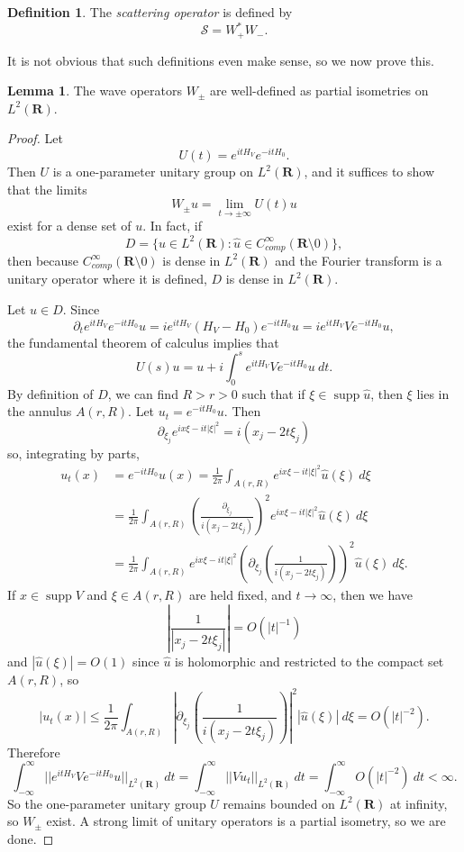 \documentclass[12pt]{report}
\newcommand{\RR}{\mathbf{R}}
\DeclareMathOperator{\supp}{supp}
\newcommand{\dfn}[1]{\emph{#1}\index{#1}}
\theoremstyle{definition}
\newtheorem{lemma}[theorem]{Lemma}
\newtheorem{definition}[theorem]{Definition}
\begin{document}
\begin{definition}
The \dfn{scattering operator} is defined by
$$\mathcal S = W_+^*W_-.$$
\end{definition}
It is not obvious that such definitions even make sense, so we now prove this.
\begin{lemma}
The wave operators $W_\pm$ are well-defined as partial isometries on $L^2(\RR)$.
\end{lemma}
\begin{proof}
Let
$$U(t) = e^{itH_V}e^{-itH_0}.$$
Then $U$ is a one-parameter unitary group on $L^2(\RR)$, and it suffices to show that the limits
$$W_\pm u = \lim_{t \to \pm \infty} U(t)u$$
exist for a dense set of $u$. In fact, if
$$D = \{u \in L^2(\RR): \hat u \in C^\infty_{comp}(\RR \setminus 0)\},$$
then because $C^\infty_{comp}(\RR \setminus 0)$ is dense in $L^2(\RR)$ and the Fourier transform is a unitary operator where it is defined, $D$ is dense in $L^2(\RR)$.

Let $u \in D$. Since
$$\partial_t e^{itH_V} e^{-itH_0} u = ie^{itH_V}(H_V - H_0)e^{-itH_0}u = ie^{itH_V}Ve^{-itH_0}u,$$
the fundamental theorem of calculus implies that
$$U(s)u = u + i\int_0^s e^{itH_V}Ve^{-itH_0}u ~dt.$$
By definition of $D$, we can find $R > r > 0$ such that if $\xi \in \supp \hat u$, then $\xi$ lies in the annulus $A(r, R)$. Let $u_t = e^{-itH_0}u$. Then
$$\partial_{\xi_j}e^{ix\xi - it|\xi|^2} = i(x_j - 2t\xi_j)$$
so, integrating by parts,
\begin{align*}
  u_t(x) &= e^{-itH_0}u(x) = \frac{1}{2\pi} \int_{A(r, R)} e^{ix\xi - it|\xi|^2} \hat u(\xi) ~d\xi\\
    &= \frac{1}{2\pi} \int_{A(r, R)} \left(\frac{\partial_{\xi_j}}{i(x_j - 2t\xi_j)}\right)^2 e^{ix\xi - it|\xi|^2} \hat u(\xi) ~d\xi\\
    &= \frac{1}{2\pi} \int_{A(r, R)} e^{ix\xi - it|\xi|^2}\left(\partial_{\xi_j}\left(\frac{1}{i(x_j - 2t\xi_j)}\right)\right)^2 \hat u(\xi) ~d\xi.
\end{align*}
If $x \in \supp V$ and $\xi \in A(r, R)$ are held fixed, and $t \to \infty$, then we have
$$\left|\frac{1}{|x_j - 2t\xi_j|}\right| = O(|t|^{-1})$$ and $|\hat u(\xi)| = O(1)$ since $\hat u$ is holomorphic and restricted to the compact set $A(r, R)$, so
$$
  |u_t(x)| \leq \frac{1}{2\pi} \int_{A(r, R)} \left|\partial_{\xi_j}\left(\frac{1}{i(x_j - 2t\xi_j)}\right)\right|^2 |\hat u(\xi)| ~d\xi
    = O(|t|^{-2}).
$$
Therefore
$$\int_{-\infty}^\infty ||e^{itH_V}Ve^{-itH_0}u||_{L^2(\RR)} ~dt = \int_{-\infty}^\infty ||Vu_t||_{L^2(\RR)} ~dt = \int_{-\infty}^\infty O(|t|^{-2}) ~dt < \infty.$$
So the one-parameter unitary group $U$ remains bounded on $L^2(\RR)$ at infinity, so $W_\pm$ exist. A strong limit of unitary operators is a partial isometry, so we are done.
\end{proof}
\end{document}
